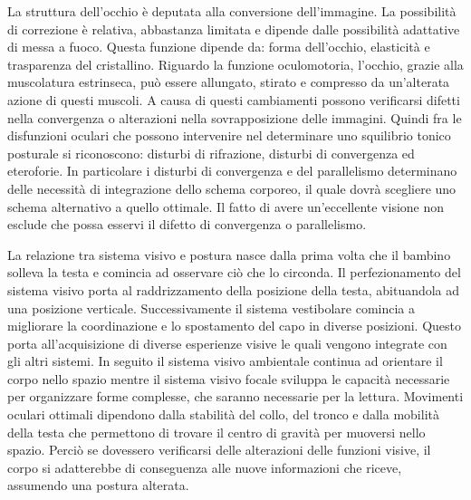 La struttura dell’occhio è deputata alla conversione dell’immagine. La possibilità di correzione è relativa, abbastanza limitata e dipende dalle possibilità adattative di messa a fuoco. Questa funzione dipende da: forma dell’occhio, elasticità e trasparenza del cristallino. Riguardo la funzione oculomotoria, l’occhio, grazie alla muscolatura estrinseca, può essere allungato, stirato e compresso da un’alterata azione di questi muscoli. A causa di questi cambiamenti possono verificarsi difetti nella convergenza o alterazioni nella sovrapposizione delle immagini. Quindi fra le disfunzioni oculari che possono intervenire nel determinare uno squilibrio tonico posturale si riconoscono: disturbi di rifrazione, disturbi di convergenza  ed eteroforie. In particolare i disturbi di convergenza e del parallelismo determinano delle necessità di integrazione dello schema corporeo, il quale dovrà scegliere uno schema alternativo a quello ottimale. Il fatto di avere un’eccellente visione non esclude che possa esservi il difetto di convergenza o parallelismo\cite{bib6}.

La relazione tra sistema visivo e postura nasce dalla prima volta che il bambino solleva la testa e comincia ad osservare ciò che lo circonda. Il perfezionamento del sistema visivo porta al raddrizzamento della posizione della testa, abituandola ad una posizione verticale. Successivamente il sistema vestibolare comincia a migliorare la coordinazione e lo spostamento del capo in diverse posizioni. Questo porta all’acquisizione di diverse esperienze visive le quali vengono integrate con gli altri sistemi. In seguito il sistema visivo ambientale continua ad orientare il corpo nello spazio mentre il sistema visivo focale sviluppa le capacità necessarie per organizzare forme complesse, che saranno necessarie per la lettura. Movimenti oculari ottimali dipendono dalla stabilità del collo, del tronco e dalla mobilità della testa che permettono di trovare il centro di gravità per muoversi nello spazio. Perciò se dovessero verificarsi delle alterazioni delle funzioni visive, il corpo si adatterebbe di conseguenza alle nuove informazioni che riceve, assumendo una postura alterata\cite{bib8}.
\\\


